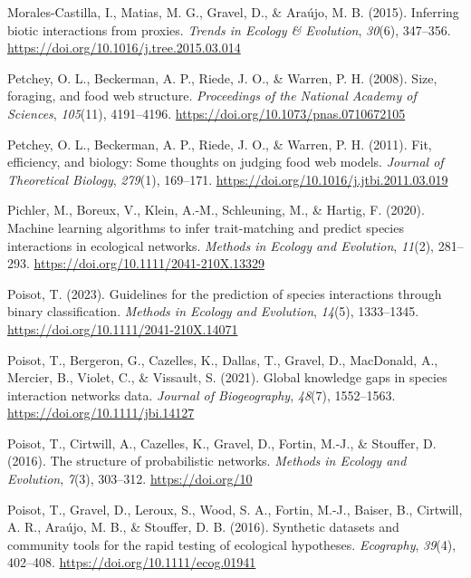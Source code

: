 \documentclass[
]{article}
\newlength{\cslhangindent}
\newenvironment{CSLReferences}[2] %
 {\begin{list}{}{%
  \setlength{\itemindent}{0pt}
  \setlength{\leftmargin}{0pt}
  \setlength{\parsep}{0pt}
  \ifodd #1
   \setlength{\leftmargin}{\cslhangindent}
   \setlength{\itemindent}{-1\cslhangindent}
  \fi
  \setlength{\itemsep}{#2\baselineskip}}}
 {\end{list}}
\begin{document}
\begin{CSLReferences}{1}{0}
Morales-Castilla, I., Matias, M. G., Gravel, D., \& Araújo, M. B.
(2015). Inferring biotic interactions from proxies. \emph{Trends in
Ecology \& Evolution}, \emph{30}(6), 347--356.
\url{https://doi.org/10.1016/j.tree.2015.03.014}

Petchey, O. L., Beckerman, A. P., Riede, J. O., \& Warren, P. H. (2008).
Size, foraging, and food web structure. \emph{Proceedings of the
National Academy of Sciences}, \emph{105}(11), 4191--4196.
\url{https://doi.org/10.1073/pnas.0710672105}

Petchey, O. L., Beckerman, A. P., Riede, J. O., \& Warren, P. H. (2011).
Fit, efficiency, and biology: {Some} thoughts on judging food web
models. \emph{Journal of Theoretical Biology}, \emph{279}(1), 169--171.
\url{https://doi.org/10.1016/j.jtbi.2011.03.019}

Pichler, M., Boreux, V., Klein, A.-M., Schleuning, M., \& Hartig, F.
(2020). Machine learning algorithms to infer trait-matching and predict
species interactions in ecological networks. \emph{Methods in Ecology
and Evolution}, \emph{11}(2), 281--293.
\url{https://doi.org/10.1111/2041-210X.13329}

Poisot, T. (2023). Guidelines for the prediction of species interactions
through binary classification. \emph{Methods in Ecology and Evolution},
\emph{14}(5), 1333--1345. \url{https://doi.org/10.1111/2041-210X.14071}

Poisot, T., Bergeron, G., Cazelles, K., Dallas, T., Gravel, D.,
MacDonald, A., Mercier, B., Violet, C., \& Vissault, S. (2021). Global
knowledge gaps in species interaction networks data. \emph{Journal of
Biogeography}, \emph{48}(7), 1552--1563.
\url{https://doi.org/10.1111/jbi.14127}

Poisot, T., Cirtwill, A., Cazelles, K., Gravel, D., Fortin, M.-J., \&
Stouffer, D. (2016). The structure of probabilistic networks.
\emph{Methods in Ecology and Evolution}, \emph{7}(3), 303--312.
\url{https://doi.org/10}

Poisot, T., Gravel, D., Leroux, S., Wood, S. A., Fortin, M.-J., Baiser,
B., Cirtwill, A. R., Araújo, M. B., \& Stouffer, D. B. (2016). Synthetic
datasets and community tools for the rapid testing of ecological
hypotheses. \emph{Ecography}, \emph{39}(4), 402--408.
\url{https://doi.org/10.1111/ecog.01941}


\end{CSLReferences}
\end{document}
